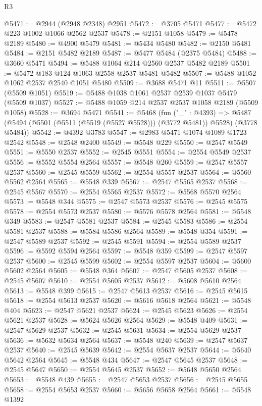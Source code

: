 \begin{lexlean}{R3}
\begin{coremodule}
@5471 := @2944 (@2948 @2348) @2951
@5472 := @3705 @5471
@5477 := @5472 @223 @1002 @1066 @2562 @2537
@5478 := @2151 @1058
@5479 := @5478 @2189
@5480 := @4900 @5479
@5481 := @5434 @5480
@5482 := @2150 @5481
@5484 := @2151 @5482 @2189
@5487 := @5477 @5484 (@2375 @5484)
@5488 := @3660 @5471
@5494 := @5488 @1064 @214 @2560 @2537 @5482 @2189
@5501 := @5472 @183 @124 @1063 @2558 @2537 @5481 @5482
@5507 := @5488 @1052 @1062 @2537 @2540 @1051 @5480
@5509 := @3688 @5471 @11
@5511 := @5507 (@5509 @1051)
@5519 := @5488 @1038 @1061 @2537 @2539 @1037 @5479 (@5509 @1037)
@5527 := @5488 @1059 @214 @2537 @2537 @1058 @2189 (@5509 @1058)
@5528 := @3694 @5471
@5541 := @5468
    (fun ("_" : @4393) =>
    @5487 (@5494 (@5501 (@5511 (@5519 (@5527 @5528))) (@3772 @5481)) @5528) (@3778 @5484))
@5542 := @4392 @3783
@5547 := @2983 @5471 @1074 @1089 @1723 @2542
@5548 := @2548 @2400
@5549 := @5548 @229
@5550 := @2547 @5549
@5551 := @5550 @2537
@5552 := @2545 @5551
@5554 := @2554 @5549 @2537
@5556 := @5552 @5554 @2564
@5557 := @5548 @260
@5559 := @2547 @5557 @2537
@5560 := @2545 @5559
@5562 := @2554 @5557 @2537
@5564 := @5560 @5562 @2564
@5565 := @5548 @339
@5567 := @2547 @5565 @2537
@5568 := @2545 @5567
@5570 := @2554 @5565 @2537
@5572 := @5568 @5570 @2564
@5573 := @5548 @344
@5575 := @2547 @5573 @2537
@5576 := @2545 @5575
@5578 := @2554 @5573 @2537
@5580 := @5576 @5578 @2564
@5581 := @5548 @349
@5583 := @2547 @5581 @2537
@5584 := @2545 @5583
@5586 := @2554 @5581 @2537
@5588 := @5584 @5586 @2564
@5589 := @5548 @354
@5591 := @2547 @5589 @2537
@5592 := @2545 @5591
@5594 := @2554 @5589 @2537
@5596 := @5592 @5594 @2564
@5597 := @5548 @359
@5599 := @2547 @5597 @2537
@5600 := @2545 @5599
@5602 := @2554 @5597 @2537
@5604 := @5600 @5602 @2564
@5605 := @5548 @364
@5607 := @2547 @5605 @2537
@5608 := @2545 @5607
@5610 := @2554 @5605 @2537
@5612 := @5608 @5610 @2564
@5613 := @5548 @399
@5615 := @2547 @5613 @2537
@5616 := @2545 @5615
@5618 := @2554 @5613 @2537
@5620 := @5616 @5618 @2564
@5621 := @5548 @404
@5623 := @2547 @5621 @2537
@5624 := @2545 @5623
@5626 := @2554 @5621 @2537
@5628 := @5624 @5626 @2564
@5629 := @5548 @409
@5631 := @2547 @5629 @2537
@5632 := @2545 @5631
@5634 := @2554 @5629 @2537
@5636 := @5632 @5634 @2564
@5637 := @5548 @240
@5639 := @2547 @5637 @2537
@5640 := @2545 @5639
@5642 := @2554 @5637 @2537
@5644 := @5640 @5642 @2564
@5645 := @5548 @434
@5647 := @2547 @5645 @2537
@5648 := @2545 @5647
@5650 := @2554 @5645 @2537
@5652 := @5648 @5650 @2564
@5653 := @5548 @439
@5655 := @2547 @5653 @2537
@5656 := @2545 @5655
@5658 := @2554 @5653 @2537
@5660 := @5656 @5658 @2564
@5661 := @5548 @1392

\end{coremodule}
\end{lexlean}
